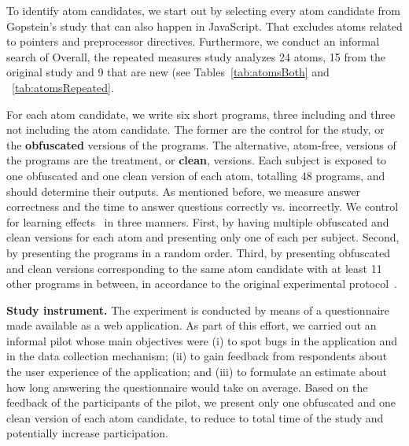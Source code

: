 To identify atom candidates, we start out by selecting every atom candidate from Gopstein's study that can also happen in JavaScript. That excludes atoms related to pointers and preprocessor directives. Furthermore, we conduct an informal search of  Overall, the repeated measures study analyzes 24 atoms, 15 from the original study and 9 that are new (see Tables~\ref{tab:atomsBoth} and ~\ref{tab:atomsRepeated}. 

For each atom candidate, we write six short programs, three including and three not including the atom candidate. The former are the control for the study, or the \textbf{obfuscated} versions of the programs. The alternative, atom-free, versions of the programs are the treatment, or \textbf{clean}, versions. Each subject is exposed to one obfuscated and one clean version of each atom, totalling 48 programs, and should determine their outputs. As mentioned before, we measure answer correctness and the time to answer questions correctly vs. incorrectly. We control for learning effects~\cite{Neely:1991:SPE} in three manners. First, by having multiple obfuscated and clean versions for each atom and presenting only one of each per subject. Second, by presenting the programs in a random order. Third, by presenting obfuscated and clean versions corresponding to the same atom candidate with at least 11 other programs in between, in  accordance to the original experimental protocol~\cite{DBLP:conf/sigsoft/GopsteinIYDZYC17}. 


{\bf Study instrument.} The experiment is conducted by means of a questionnaire made available as a web application. As part of this effort, we carried out an informal pilot whose main objectives were (i) to spot bugs in the application and in the data collection mechanism; (ii) to gain feedback from respondents about the user experience of the application; and (iii) to formulate an estimate about how long answering the questionnaire would take on average. Based on the feedback of the participants of the pilot, we present only one obfuscated and one clean version of each atom candidate, to reduce to total time of the study and potentially increase participation.%

